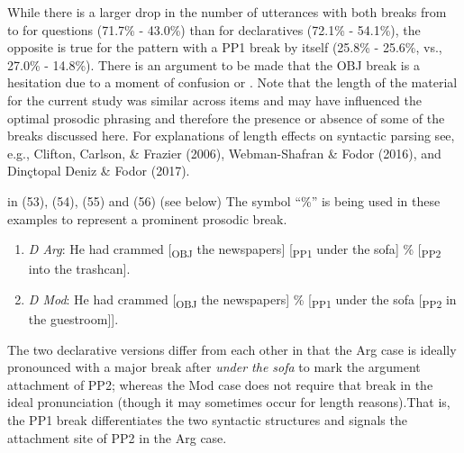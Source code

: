 \documentclass[12pt,oneside]{book}
\providecommand{\tightlist}{%
  \setlength{\itemsep}{0pt}\setlength{\parskip}{0pt}}
\begin{document}
While there is a larger drop in the number of utterances with both breaks from  to  for questions (71.7\% - 43.0\%) than for declaratives (72.1\% - 54.1\%), the opposite is true for the pattern with a PP1 break by itself (25.8\% - 25.6\%, vs., 27.0\% - 14.8\%). There is an argument to be made that the OBJ break is  a hesitation  due to a moment of confusion or . Note that the length of the material for the current study was similar across items and may have influenced the optimal prosodic phrasing and therefore the presence or absence of some of the breaks discussed here. For explanations of length effects on syntactic parsing see, e.g., Clifton, Carlson, \& Frazier (2006), Webman-Shafran \& Fodor (2016), and Dinçtopal Deniz \& Fodor (2017).

 in (53), (54), (55) and (56) (see below)  The symbol ``\%'' is being used in these examples to represent a prominent prosodic break.

\begin{enumerate}
\def\labelenumi{(\arabic{enumi})}
\setcounter{enumi}{52}
\tightlist
\item
  \emph{D Arg}: He had crammed {[}\textsubscript{OBJ} the newspapers{]} {[}\textsubscript{PP1} under the sofa{]} \% {[}\textsubscript{PP2} into the trashcan{]}.
\item
  \emph{D Mod}: He had crammed {[}\textsubscript{OBJ} the newspapers{]} \% {[}\textsubscript{PP1} under the sofa {[}\textsubscript{PP2} in the guestroom{]}{]}.
\end{enumerate}

The two declarative versions differ from each other in that the Arg case is ideally pronounced with a major break after \emph{under the sofa} to mark the argument attachment of PP2; whereas the Mod case does not require that break in the ideal pronunciation (though it may sometimes occur for length reasons).That is, the PP1 break differentiates the two syntactic structures and signals the attachment site of PP2 in the Arg case.
\end{document}
